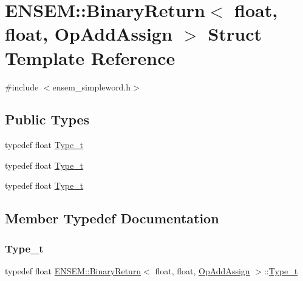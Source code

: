 \hypertarget{structENSEM_1_1BinaryReturn_3_01float_00_01float_00_01OpAddAssign_01_4}{}\section{E\+N\+S\+EM\+:\+:Binary\+Return$<$ float, float, Op\+Add\+Assign $>$ Struct Template Reference}
\label{structENSEM_1_1BinaryReturn_3_01float_00_01float_00_01OpAddAssign_01_4}


{\ttfamily \#include $<$ensem\+\_\+simpleword.\+h$>$}

\subsection*{Public Types}
\begin{DoxyCompactItemize}
\item 
typedef float \mbox{\hyperlink{structENSEM_1_1BinaryReturn_3_01float_00_01float_00_01OpAddAssign_01_4_af39f6f2b4b50fa85e57dfdabddfab31a}{Type\+\_\+t}}
\item 
typedef float \mbox{\hyperlink{structENSEM_1_1BinaryReturn_3_01float_00_01float_00_01OpAddAssign_01_4_af39f6f2b4b50fa85e57dfdabddfab31a}{Type\+\_\+t}}
\item 
typedef float \mbox{\hyperlink{structENSEM_1_1BinaryReturn_3_01float_00_01float_00_01OpAddAssign_01_4_af39f6f2b4b50fa85e57dfdabddfab31a}{Type\+\_\+t}}
\end{DoxyCompactItemize}


\subsection{Member Typedef Documentation}
\mbox{\label{structENSEM_1_1BinaryReturn_3_01float_00_01float_00_01OpAddAssign_01_4_af39f6f2b4b50fa85e57dfdabddfab31a}} 
\subsubsection{\texorpdfstring{Type\_t}{Type\_t}\hspace{0.1cm}{\footnotesize\ttfamily [1/3]}}
{\footnotesize\ttfamily typedef float \mbox{\hyperlink{structENSEM_1_1BinaryReturn}{E\+N\+S\+E\+M\+::\+Binary\+Return}}$<$ float, float, \mbox{\hyperlink{structENSEM_1_1OpAddAssign}{Op\+Add\+Assign}} $>$\+::\mbox{\hyperlink{structENSEM_1_1BinaryReturn_3_01float_00_01float_00_01OpAddAssign_01_4_af39f6f2b4b50fa85e57dfdabddfab31a}{Type\+\_\+t}}}

